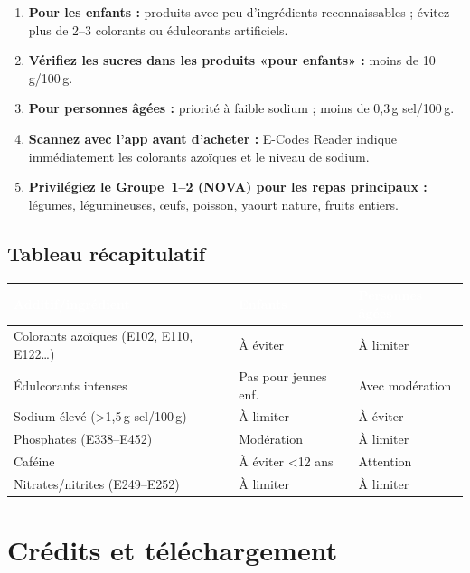 \documentclass[a5paper,12pt,oneside,openany]{book}
\begin{document}
\begin{enumerate}
  \item \textbf{Pour les enfants :} produits avec peu d'ingrédients reconnaissables ;
    évitez plus de 2--3 colorants ou édulcorants artificiels.
  \item \textbf{Vérifiez les sucres dans les produits «pour enfants» :}
    moins de 10\,g/100\,g.
  \item \textbf{Pour personnes âgées :} priorité à faible sodium ;
    moins de 0,3\,g sel/100\,g.
  \item \textbf{Scannez avec l'app avant d'acheter :} E-Codes Reader indique
    immédiatement les colorants azoïques et le niveau de sodium.
  \item \textbf{Privilégiez le Groupe~1--2 (NOVA) pour les repas principaux :}
    légumes, légumineuses, œufs, poisson, yaourt nature, fruits entiers.
\end{enumerate}

\section{Tableau récapitulatif}

{\small
\begin{tabularx}{\textwidth}{|L|l|l|}
\hline
{}
  \textcolor{white}{\textbf{Additif/ingrédient}}
  & \textcolor{white}{\textbf{Enfants}}
  & \textcolor{white}{\textbf{Personnes âgées}} \\
\hline
Colorants azoïques (E102, E110, E122\ldots) & À éviter & À limiter \\
\hline
Édulcorants intenses & Pas pour jeunes enf. & Avec modération \\
\hline
Sodium élevé (>1,5\,g sel/100\,g) & À limiter & À éviter \\
\hline
Phosphates (E338--E452) & Modération & À limiter \\
\hline
Caféine & À éviter <12 ans & Attention \\
\hline
Nitrates/nitrites (E249--E252) & À limiter & À limiter \\
\hline
\end{tabularx}
}

\backmatter

\chapter*{Crédits et téléchargement}
\end{document}
